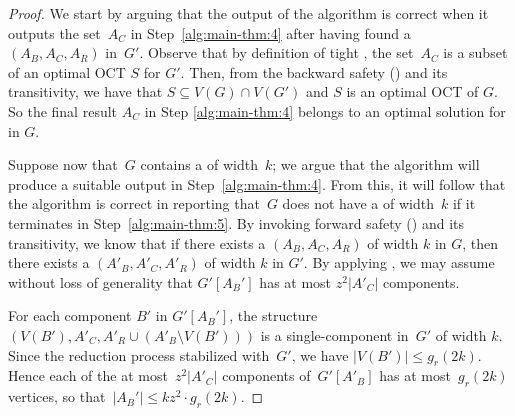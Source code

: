 \begin{proof}
	We start by arguing that the output of the algorithm is correct when it outputs the set~$A_C$ in Step~\ref{alg:main-thm:4} after having found a \zocc~$(A_B, A_C, A_R)$ in~$G'$. Observe that by definition of tight \occ, the set~$A_C$ is a subset of an optimal OCT $S$ for $G'$. Then, from the backward safety () and its  transitivity, we have that 
  $S \subseteq V(G) \cap V(G')$ and $S$ is an optimal OCT of $G$. So the final result $A_C$ in Step \ref{alg:main-thm:4} belongs to an optimal solution for \PrbOCTLong in $G$.
	
	Suppose now that~$G$ contains a \zocc of width~$k$; we argue that the algorithm will produce a suitable output in Step~\ref{alg:main-thm:4}. From this, it will follow that the algorithm is correct in reporting that~$G$ does not have a \zocc of width~$k$ if it terminates in Step~\ref{alg:main-thm:5}. By invoking forward safety () and its transitivity,
  we know that if there exists a \zocc $(A_B, A_C, A_R)$ of width $k$ in $G$, 
  then there exists a \zocc $(A'_B, A'_C, A'_R)$ of width $k$ in $G'$. By applying , we may assume without loss of generality that 
  $G'[A_B']$ has at most $z^2|A'_C|$ components.
	
	For each component $B'$ in $G'[A_B']$, the structure $(V(B'),A'_C,A'_R \cup (A'_B \setminus V(B')))$ is a single-component \occ in~$G'$ of width $k$. Since the reduction process stabilized with~$G'$, we have $|V(B')| \leq g_r(2k)$. Hence each of the at most~$z^2|A'_C|$ components of~$G'[A'_B]$ has at most~$g_r(2k)$ vertices, so that~$|A_B'| \leq k z^2 \cdot g_r(2k)$.

	


\end{proof}
